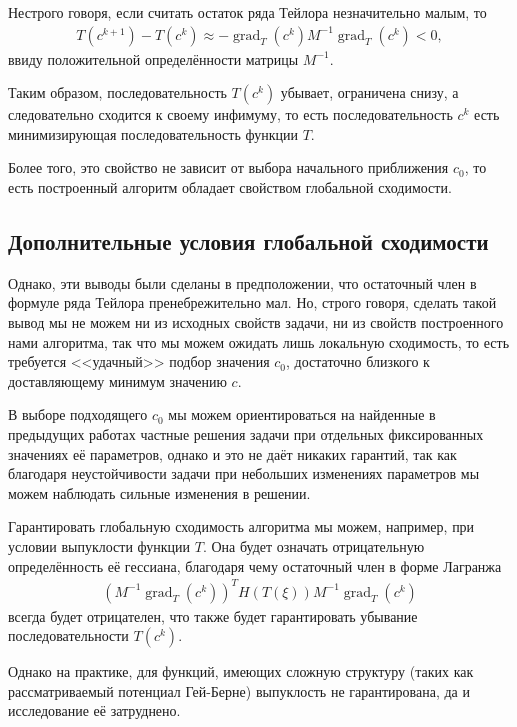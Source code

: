 \documentclass[a4paper,14pt]{extarticle}
\begin{document}
    Нестрого говоря, если считать остаток ряда Тейлора незначительно малым, то
    \begin{gather*}
        T(c^{k+1})
        - T(c^{k})
        \approx
        - \operatorname{grad}_T(c^k) M^{-1} \operatorname{grad}_T(c^k)
        < 0,
    \end{gather*}
    ввиду положительной определённости матрицы $M^{-1}$.

    Таким образом, последовательность $T(c^{k})$ убывает, ограничена снизу,
    а следовательно сходится к своему инфимуму, то есть последовательность
    $c^k$ есть минимизирующая последовательность функции $T$.

    Более того, это свойство не зависит от выбора начального приближения
    $c_0$, то есть построенный алгоритм обладает свойством глобальной сходимости.

    \subsection{Дополнительные условия глобальной сходимости}

    Однако, эти выводы были сделаны в предположении, что остаточный член в
    формуле ряда Тейлора пренебрежительно мал.
    Но, строго говоря, сделать такой вывод мы не можем ни из исходных свойств
    задачи, ни из свойств построенного нами алгоритма, так что мы можем ожидать лишь
    локальную сходимость, то есть требуется <<удачный>> подбор
    значения $c_0$, достаточно близкого к доставляющему минимум значению $c$.

    В выборе подходящего $c_0$ мы можем ориентироваться на найденные
    в предыдущих работах частные решения задачи при отдельных фиксированных
    значениях её параметров, однако и это не даёт никаких гарантий, так как
    благодаря неустойчивости задачи при небольших изменениях параметров мы можем
    наблюдать сильные изменения в решении.

    Гарантировать глобальную сходимость алгоритма мы можем, например, при условии
    выпуклости функции $T$.
    Она будет означать отрицательную определённость её гессиана, благодаря чему
    остаточный член в форме Лагранжа
    \begin{gather*}
        (M^{-1} \operatorname{grad}_T(c^k))^T
        H(T(\xi))
        M^{-1} \operatorname{grad}_T(c^k)
    \end{gather*}
    всегда будет отрицателен, что также будет гарантировать убывание последовательности
    $T(c^k)$.

    Однако на практике, для функций, имеющих сложную структуру (таких как
    рассматриваемый потенциал Гей-Берне) выпуклость не гарантирована, да и
    исследование её затруднено.
\end{document}
